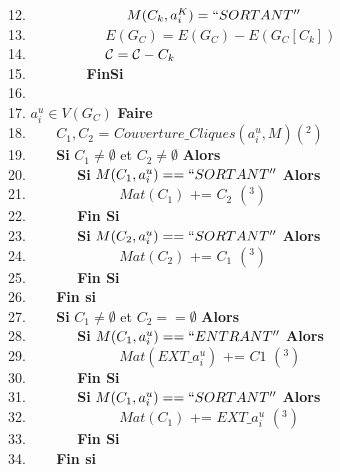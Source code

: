 \begin{algorithm}
~12.		\indent ~~~~~~~~~~~~~ $M(C_k, a_i^K) = ``SORTANT''$ \\
~13.		\indent~~~~~~~~~~ $E(G_{C}) =  E(G_C)  - E(G_C[C_k])$ \\
~14.		\indent~~~~~~~~~~ ${\cal C} =  {\cal C}  - C_k$ \\
~15.       	\indent~~~~~~~~{\bf FinSi} \\
~16.  \\
~17.  $a_i^u \in V(G_C)$ {\bf Faire} \\
~18. \indent ~~~ $C_1, C_2$ = $Couverture\_Cliques(a_i^u, M)(^2)$\\
~19. \indent ~~~ {\bf Si } $C_1 \neq \emptyset$ et $C_2 \neq \emptyset$ {\bf Alors} \\
~20. \indent ~~~~~~  {\bf Si}  $M(C_1, a_i^u) == ``SORTANT''$ {\bf Alors} \\
~21. \indent ~~~~~~~~~~~~ $Mat(C_1)$ += $C_2$ $(^3)$ \\  
~22. \indent ~~~~~~  {\bf Fin Si} \\
~23. \indent ~~~~~~  {\bf Si}  $M(C_2, a_i^u) == ``SORTANT''$ {\bf Alors} \\
~24. \indent ~~~~~~~~~~~~ $Mat(C_2)$ += $C_1$ $(^3)$ \\  
~25. \indent ~~~~~~  {\bf Fin Si} \\
~26. \indent ~~~ {\bf Fin si} \\
~27. \indent ~~~ {\bf Si } $C_1 \neq \emptyset$ et $C_2 == \emptyset$ {\bf Alors} \\
~28. \indent ~~~~~~  {\bf Si}  $M(C_1, a_i^u) == ``ENTRANT''$ {\bf Alors} \\
~29. \indent ~~~~~~~~~~~~ $Mat(EXT\_a_i^u)$ += $C1$ $(^3)$\\  
~30. \indent ~~~~~~  {\bf Fin Si} \\
~31. \indent ~~~~~~  {\bf Si}  $M(C_1, a_i^u) == ``SORTANT''$ {\bf Alors} \\
~32. \indent ~~~~~~~~~~~~ $Mat(C_1)$ += $EXT\_a_i^u$ $(^3)$ \\  
~33. \indent ~~~~~~  {\bf Fin Si} \\
~34. \indent ~~~ {\bf Fin si} \\

\end{algorithm}
